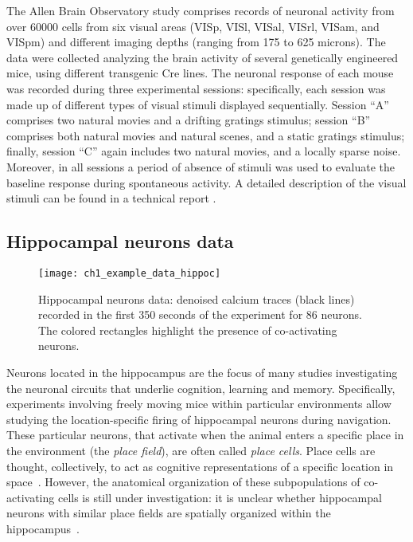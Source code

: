 The Allen Brain Observatory study comprises records of neuronal activity from over $60000$ cells from six visual areas (VISp, VISl, VISal, VISrl, VISam, and VISpm) and different imaging depths (ranging from 175 to 625 microns). The data were collected analyzing the brain activity of several genetically engineered mice, using different transgenic Cre lines.
The neuronal response of each mouse was recorded during three experimental sessions: specifically, each session was made up of different types of visual stimuli displayed sequentially.
Session ``A'' comprises two natural movies and a drifting gratings stimulus; session ``B'' comprises both natural movies and natural scenes, and a static gratings stimulus; finally, session ``C'' again includes two natural movies, and a locally sparse noise. Moreover, in all sessions a period of absence of stimuli was used to evaluate the baseline response during spontaneous activity. 
A detailed description of the visual stimuli can be found in a technical report \parencite{allen_stimulus}.





\subsection{Hippocampal neurons data}
\label{ch1_sec:hippoc_data}
\begin{figure}
	\centering
	\texttt{[image: ch1\_example\_data\_hippoc]}
	\caption[Calcium traces of 88 neurons from the hippocampal neurons data.]{Hippocampal neurons data: denoised calcium traces (black lines) recorded in the first 350 seconds of the experiment for 86 neurons. The colored rectangles highlight the presence of co-activating neurons.}\label{ch1_fig:data_hippoc}
\end{figure}

Neurons located in the hippocampus are the focus of many studies investigating the neuronal circuits that underlie cognition, learning and memory.
Specifically, experiments involving freely moving mice within particular environments allow studying the location-specific firing of hippocampal neurons during navigation. These particular neurons, that activate when the animal enters a specific place in the environment (the \textit{place field}), are often called \textit{place cells}. Place cells are thought, collectively, to act as cognitive representations of a specific location in space~\parencite{okeefe1978}. However, the anatomical organization of these subpopulations of co-activating cells is still under investigation: it is unclear whether hippocampal neurons with similar place fields are spatially organized within the hippocampus~\parencite{dombeck2010}.

